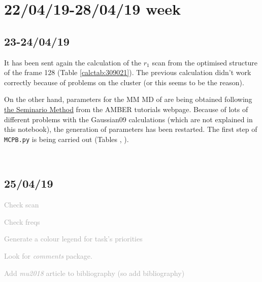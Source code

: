 \chapter{22/04/19-28/04/19 week}

\section{23-24/04/19}\label{day:190424}
\Hydroxilation

	It has been sent again the calculation of the $r_1$ scan from the optimised structure of the frame 128 (Table \ref{calctab:309021}). The previous calculation didn't work correctly because of problems on the cluster (or this seems to be the reason).
	

	On the other hand, parameters for the MM MD of are being obtained following \href{http://ambermd.org/tutorials/advanced/tutorial20/mcpbpy.htm}{the Seminario Method} from the AMBER tutorials webpage. Because of lots of different problems with the Gaussian09 calculations (which are not explained in this notebook), the generation of parameters has been restarted. The first step of \texttt{MCPB.py} is being carried out (Tables , ). 

	\ \\
	


\section{25/04/19}\label{day:190425}

\Tasks

	\textcolor{darkgray}{
		\begin{todolist}
			\item[\done] Check scan 
			\item[\done] Check freqs 
			\item Generate a colour legend for task's priorities
			\item Look for \emph{comments} package.
			\item Add \emph{mu2018} article to bibliography (so add bibliography)
		\end{todolist}
	}

